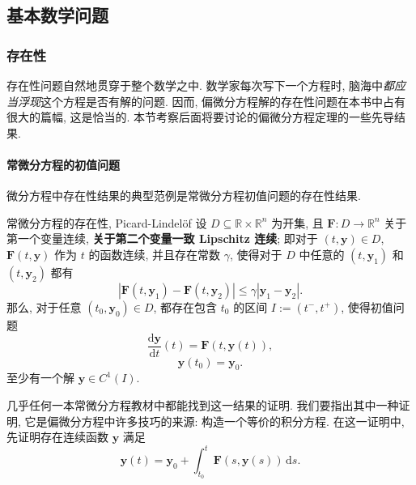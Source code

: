 \subsection{基本数学问题}\label{sec:basic-mathematical-questions}

\subsubsection{存在性}\label{subsec:existence}

存在性问题自然地贯穿于整个数学之中. 数学家每次写下一个方程时, 脑海中\emph{都应当浮现}这个方程是否有解的问题. 因而, 偏微分方程解的存在性问题在本书中占有很大的篇幅, 这是恰当的. 本节考察后面将要讨论的偏微分方程定理的一些先导结果.

\paragraph*{常微分方程的初值问题}

微分方程中存在性结果的典型范例是常微分方程初值问题的存在性结果.

\begin{Theorem}{常微分方程的存在性, Picard-Lindelöf}
\label{thm:ode-existence}
设 $D\subseteq\mathbb{R}\times\mathbb{R}^n$ 为开集, 且 $\bm{F}:D\to\mathbb{R}^n$ 关于第一个变量连续, \textbf{关于第二个变量一致 Lipschitz 连续}; 即对于 $(t,\bm{y})\in D$, $\bm{F}(t,\bm{y})$ 作为 $t$ 的函数连续, 并且存在常数 $\gamma$, 使得对于 $D$ 中任意的 $(t,\bm{y}_1)$ 和 $(t,\bm{y}_2)$ 都有
\begin{equation}\label{eq:uniform-lipschitz-bound}
|\bm{F}(t,\bm{y}_1)-\bm{F}(t,\bm{y}_2)|\leq\gamma|\bm{y}_1-\bm{y}_2|.
\end{equation}
那么, 对于任意 $(t_0,\bm{y}_0)\in D$, 都存在包含 $t_0$ 的区间 $I:=(t^-,t^+)$, 使得初值问题
\begin{equation}\label{eq:ode-initial-value-dynamics}
\dfrac{\mathrm{d}\bm{y}}{\mathrm{d}t}(t)=\bm{F}(t,\bm{y}(t)),
\end{equation}
\begin{equation}\label{eq:ode-initial-value-data}
\bm{y}(t_0)=\bm{y}_0.
\end{equation}
至少有一个解 $\bm{y}\in C^1(I)$.
\end{Theorem}

几乎任何一本常微分方程教材中都能找到这一结果的证明. 我们要指出其中一种证明, 它是偏微分方程中许多技巧的来源: 构造一个等价的积分方程. 在这一证明中, 先证明存在连续函数 $\bm{y}$ 满足
\begin{equation}\label{eq:ode-integral-equation}
\bm{y}(t)=\bm{y}_0+\int_{t_0}^t\bm{F}(s,\bm{y}(s))\,\mathrm{d}s.
\end{equation}

